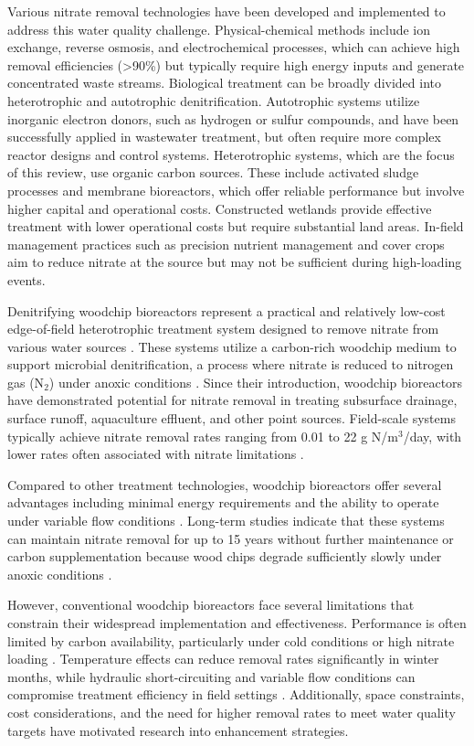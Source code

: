 \documentclass[12pt,a4paper]{article}
\begin{document}
Various nitrate removal technologies have been developed and implemented to address this water quality challenge. Physical-chemical methods include ion exchange, reverse osmosis, and electrochemical processes, which can achieve high removal efficiencies (>90\%) but typically require high energy inputs and generate concentrated waste streams. Biological treatment can be broadly divided into heterotrophic and autotrophic denitrification. Autotrophic systems utilize inorganic electron donors, such as hydrogen or sulfur compounds, and have been successfully applied in wastewater treatment, but often require more complex reactor designs and control systems. Heterotrophic systems, which are the focus of this review, use organic carbon sources. These include activated sludge processes and membrane bioreactors, which offer reliable performance but involve higher capital and operational costs. Constructed wetlands provide effective treatment with lower operational costs but require substantial land areas. In-field management practices such as precision nutrient management and cover crops aim to reduce nitrate at the source but may not be sufficient during high-loading events.

Denitrifying woodchip bioreactors represent a practical and relatively low-cost edge-of-field heterotrophic treatment system designed to remove nitrate from various water sources \citep{RN625, RN310, new_ref_2}. These systems utilize a carbon-rich woodchip medium to support microbial denitrification, a process where nitrate is reduced to nitrogen gas (N$_{2}$) under anoxic conditions \citep{RN242, RN629}. Since their introduction, woodchip bioreactors have demonstrated potential for nitrate removal in treating subsurface drainage, surface runoff, aquaculture effluent, and other point sources. Field-scale systems typically achieve nitrate removal rates ranging from 0.01 to 22 g N/m$^3$/day, with lower rates often associated with nitrate limitations \citep{RN625, RN310}.

Compared to other treatment technologies, woodchip bioreactors offer several advantages including minimal energy requirements and the ability to operate under variable flow conditions \citep{RN625, RN310}. Long-term studies indicate that these systems can maintain nitrate removal for up to 15 years without further maintenance or carbon supplementation because wood chips degrade sufficiently slowly under anoxic conditions \citep{RN625, RN629}.

However, conventional woodchip bioreactors face several limitations that constrain their widespread implementation and effectiveness. Performance is often limited by carbon availability, particularly under cold conditions or high nitrate loading \citep{RN625, RN228, RN258}. Temperature effects can reduce removal rates significantly in winter months, while hydraulic short-circuiting and variable flow conditions can compromise treatment efficiency in field settings \citep{RN228, RN309}. Additionally, space constraints, cost considerations, and the need for higher removal rates to meet water quality targets have motivated research into enhancement strategies.
\end{document}
